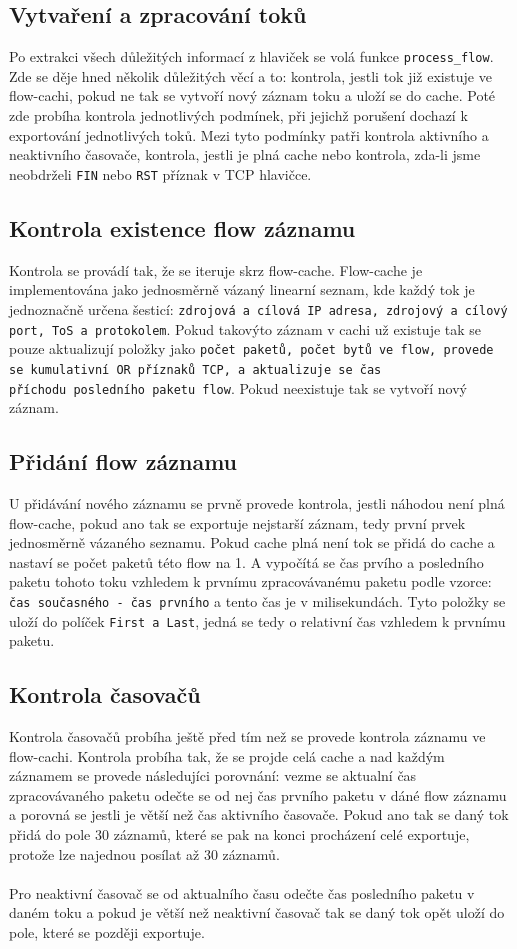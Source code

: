 \documentclass[12pt]{article}
\begin{document}
\subsection{Vytvaření a zpracování toků}
Po extrakci všech důležitých informací z hlaviček se volá funkce \texttt{process\_flow}. Zde se děje hned několik důležitých věcí a to: kontrola, jestli tok již existuje ve flow-cachi, pokud ne tak se vytvoří nový záznam toku a uloží se do cache. Poté zde probíha kontrola
jednotlivých podmínek, při jejichž porušení dochazí k exportování jednotlivých toků. Mezi tyto podmínky patři kontrola aktivního a neaktivního časovače, kontrola, jestli je plná cache nebo kontrola, zda-li jsme neobdrželi \texttt{FIN} nebo \texttt{RST} příznak v TCP hlavičce.
\subsection*{Kontrola existence flow záznamu}
Kontrola se provádí tak, že se iteruje skrz flow-cache. Flow-cache je implementována jako jednosměrně vázaný linearní seznam, kde každý tok je jednoznačně určena šesticí: \texttt{zdrojová a cílová IP adresa, zdrojový a cílový port, ToS a protokolem}.  
 Pokud takovýto záznam v cachi už existuje tak se pouze aktualizují položky jako \texttt{počet paketů, počet bytů ve flow, provede se kumulativní OR příznaků TCP, a aktualizuje se čas\\ příchodu posledního paketu flow}.
Pokud neexistuje tak se vytvoří nový záznam.

\subsection*{Přidání flow záznamu}
U přidávání nového záznamu se prvně provede kontrola, jestli náhodou není plná flow-cache, pokud ano tak se exportuje nejstarší záznam, tedy první prvek jednosměrně vázaného seznamu.
Pokud cache plná není tok se přidá do cache a nastaví se počet paketů této flow na 1. A vypočítá se čas prvího a posledního paketu tohoto toku vzhledem k prvnímu zpracovávanému paketu podle vzorce: 
\texttt{čas současného - čas prvního} a tento čas je v milisekundách. Tyto položky se uloží do políček \texttt{First a Last}, jedná se tedy o relativní čas vzhledem k prvnímu paketu.
\subsection*{Kontrola časovačů}
Kontrola časovačů probíha ještě před tím než se provede kontrola záznamu ve flow-cachi. Kontrola probíha tak, že se projde celá cache a nad každým záznamem se provede následujíci porovnání: vezme se aktualní čas zpracovávaného paketu odečte se od nej čas prvního paketu v dáné flow záznamu a porovná se jestli je větší než čas aktivního časovače.
Pokud ano tak se daný tok přidá do pole 30 záznamů, které se pak na konci procházení celé exportuje, protože lze najednou posílat až 30 záznamů.
\\\\
Pro neaktivní časovač se od aktualního času odečte čas posledního paketu v daném toku a pokud je větší než neaktivní časovač tak se daný tok opět uloží do pole, které se později exportuje.
\end{document}
